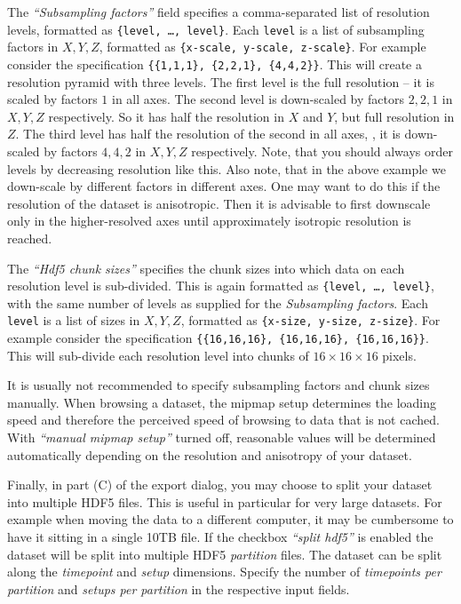 \documentclass{scrartcl}
\begin{document}
The \emph{``Subsampling factors''} field specifies a comma-separated list of resolution levels, formatted as \texttt{\{level, \dots, level\}}.
Each \texttt{level} is a list of subsampling factors in $X, Y, Z$, formatted as \texttt{\{x-scale, y-scale, z-scale\}}.
For example consider the specification \texttt{\{\{1,1,1\}, \{2,2,1\}, \{4,4,2\}\}}.
This will create a resolution pyramid with three levels.
The first level is the full resolution -- it is scaled by factors $1$ in all axes.
The second level is down-scaled by factors $2, 2, 1$ in $X, Y, Z$ respectively.
So it has half the resolution in $X$ and $Y$, but full resolution in $Z$.
The third level has half the resolution of the second in all axes, \ie, it is down-scaled by factors $4, 4, 2$ in $X, Y, Z$ respectively.
Note, that you should always order levels by decreasing resolution like this.
Also note, that in the above example we down-scale by different factors in different axes.
One may want to do this if the resolution of the dataset is anisotropic.
Then it is advisable to first downscale only in the higher-resolved axes until approximately isotropic resolution is reached.

The \emph{``Hdf5 chunk sizes''} specifies the chunk sizes into which data on each resolution level is sub-divided.
This is again formatted as \texttt{\{level, \dots, level\}}, with the same number of levels as supplied for the \emph{Subsampling factors}.
Each \texttt{level} is a list of sizes in $X, Y, Z$, formatted as \texttt{\{x-size, y-size, z-size\}}.
For example consider the specification \texttt{\{\{16,16,16\}, \{16,16,16\}, \{16,16,16\}\}}.
This will sub-divide each resolution level into chunks of $16\times 16\times 16$ pixels.

It is usually not recommended to specify subsampling factors and chunk sizes manually.
When browsing a dataset, the mipmap setup determines the loading speed and therefore the perceived speed of browsing to data that is not cached.
With \emph{``manual mipmap setup''} turned off, reasonable values will be determined automatically depending on the resolution and anisotropy of your dataset.

Finally, in part (C) of the export dialog, you may choose to split your dataset into multiple HDF5 files.
This is useful in particular for very large datasets.
For example when moving the data to a different computer, it may be cumbersome to have it sitting in a single 10TB file.
If the checkbox \emph{``split hdf5''} is enabled the dataset will be split into multiple HDF5 \emph{partition} files.
The dataset can be split along the \emph{timepoint} and \emph{setup} dimensions.
Specify the number of \emph{timepoints per partition} and \emph{setups per partition} in the respective input fields.
\end{document}
